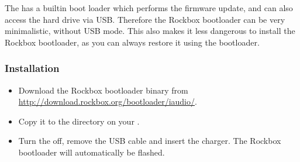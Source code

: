 
The \playername{} has a builtin boot loader which performs the
firmware update, and can also access the hard drive via USB. Therefore the
Rockbox bootloader can be very minimalistic, without USB mode.
This also makes it less dangerous to install the Rockbox bootloader, as you can
always restore it using the \playerman{} bootloader.


\subsubsection{Installation}
\begin{itemize}
\item Download the Rockbox bootloader binary from 
\url{http://download.rockbox.org/bootloader/iaudio/}.
\item Copy it to the  directory on your \dap{}.
\item Turn the \dap{} off, remove the USB cable and insert the charger. The
Rockbox bootloader will automatically be flashed.
\end{itemize}
